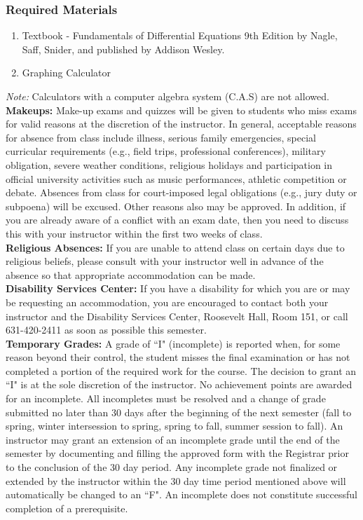 \documentclass[11pt]{article}
\begin{document}
\subsubsection*{Required Materials}
\begin{enumerate}[--]
 \item Textbook - Fundamentals of Differential Equations 9th Edition by Nagle, Saff, Snider, and published by Addison Wesley. \\
 \item Graphing Calculator
\end{enumerate}
\emph{Note:} Calculators with a computer algebra system (C.A.S) are not allowed. \\

{\bf Makeups:} Make-up exams and quizzes will be given to students who miss exams for valid reasons at the discretion of the instructor. In general, acceptable reasons for absence from class include illness, serious family emergencies, special curricular requirements (e.g., field trips, professional conferences), military obligation, severe weather conditions, religious holidays and participation in official university activities such as music performances, athletic competition or debate. Absences from class for court-imposed legal obligations (e.g., jury duty or subpoena) will be excused. Other reasons also may be approved. In addition, if you are already aware of a conflict with an exam date, then you need to discuss this with your instructor within the first two weeks of class. \\

{\bf Religious Absences:} If you are unable to attend class on certain days due to religious beliefs, please consult with your instructor well in advance of the absence so that appropriate accommodation can be made.\\

{\bf Disability Services Center:} If you have a disability for which you are or may be requesting an accommodation, you are encouraged to contact both your instructor and the Disability Services Center, Roosevelt Hall, Room 151, or call 631-420-2411 as soon as possible this semester.\\

{\bf Temporary Grades:} A grade of ``I" (incomplete) is reported when, for some reason beyond their control, the student misses the final examination or has not completed a portion of the required work for the course. The decision to grant an ``I" is at the sole discretion of the instructor. No achievement points are awarded for an incomplete. All incompletes must be resolved and a change of grade submitted no later than 30 days after the beginning of the next semester (fall to spring, winter intersession to spring, spring to fall, summer session to fall). An instructor may grant an extension of an incomplete grade until the end of the semester by documenting and filling the approved form with the Registrar prior to the conclusion of the 30 day period. Any incomplete grade not finalized or extended by the instructor within the 30 day time period mentioned above will automatically be changed to an ``F". An incomplete does not constitute successful completion of a prerequisite.  \\
\end{document}

